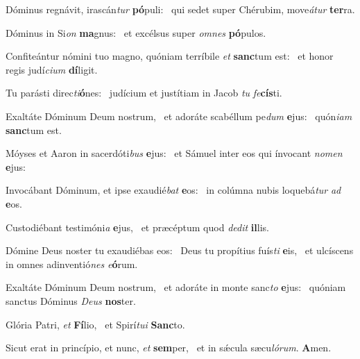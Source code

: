 \item Dóminus regnávit, irascán\textit{tur} \textbf{pó}puli:~\psstar{} qui sedet super Chérubim, move\textit{átur} \textbf{ter}ra.
\item Dóminus in Si\textit{on} \textbf{ma}gnus:~\psstar{} et excélsus super \textit{omnes} \textbf{pó}pulos.
\item Confiteántur nómini tuo magno, quóniam terríbile \textit{et} \textbf{sanc}tum est:~\psstar{} et honor regis judí\textit{cium} \textbf{dí}ligit.
\item Tu parásti direc\textit{ti}\textbf{ó}nes:~\psstar{} judícium et justítiam in Jacob \textit{tu} \textit{fe}\textbf{cís}ti.
\item Exaltáte Dóminum Deum nostrum,~\pscross{} et adoráte scabéllum pe\textit{dum} \textbf{e}jus:~\psstar{} quón\textit{iam} \textbf{sanc}tum est.
\item Móyses et Aaron in sacerdóti\textit{bus} \textbf{e}jus:~\psstar{} et Sámuel inter eos qui ínvocant \textit{nomen} \textbf{e}jus:
\item Invocábant Dóminum, et ipse exaudié\textit{bat} \textbf{e}os:~\psstar{} in colúmna nubis loquebá\textit{tur} \textit{ad} \textbf{e}os.
\item Custodiébant testimóni\textit{a} \textbf{e}jus,~\psstar{} et præcéptum quod \textit{dedit} \textbf{il}lis.
\item Dómine Deus noster tu exaudiébas eos:~\pscross{} Deus tu propítius fuís\textit{ti} \textbf{e}is,~\psstar{} et ulcíscens in omnes adinventió\textit{nes} \textit{e}\textbf{ó}rum.
\item Exaltáte Dóminum Deum nostrum,~\pscross{} et adoráte in monte sanc\textit{to} \textbf{e}jus:~\psstar{} quóniam sanctus Dóminus \textit{Deus} \textbf{nos}ter.
\item Glória Patri, \textit{et} \textbf{Fí}lio,~\psstar{} et Spirí\textit{tui} \textbf{Sanc}to.
\item Sicut erat in princípio, et nunc, \textit{et} \textbf{sem}per,~\psstar{} et in sǽcula sæcu\textit{lórum}. \textbf{A}men.